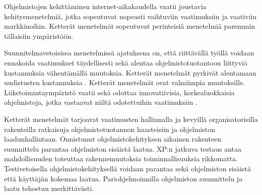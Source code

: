\documentclass[finnish]{tktltiki2}
\theoremstyle{definition}
\theoremstyle{remark}
\begin{document}
Ohjelmistojen kehittäminen internet-aikakaudella vaatii joustavia kehitysmenetelmiä, jotka sopeutuvat nopeasti vaihtuviin vaatimuksiin ja vaativiin markkinoihin. Ketterät menetelmät sopeutuvat perinteisiä menetelmiä paremmin tällaisiin ympäristöön.

Suunnitelmavetoisissa menetelmissä ajatuksena on, että riittävällä työllä voidaan ennakoida vaatimukset täydellisesti sekä alentaa ohjelmistotuotantoon liittyviä kustannuksia vähentämällä muutoksia. Ketterät menetelmät pyrkivät alentamaan uudistusten kustannuksia \cite{WIC03}. Ketterät menetelmät ovat valmiimpia muutoksille. Liiketoimintaympäristö vaatii sekä odottaa innovatiivisia, korkealuokkaisia ohjelmistoja, jotka vastaavat niiltä odotettuihin vaatimuksiin \cite{BRL03}.

Ketterät menetelmät tarjoavat vaatimusten hallinnalla ja kevyillä organisatorisilla rakenteilla ratkaisuja ohjelmistotuotannon haasteisiin ja ohjelmiston laadunhallintaan. Onnistunut ohjelmistokehityksen aikainen rakenteen suunnittelu parantaa ohjelmiston sisäistä laatua. XP:n jatkuva testaus antaa mahdollisuuden toteuttaa rakennemuutoksia toiminnallisuuksia rikkomatta. Testivetoisella ohjelmistokehityksellä voidaan parantaa sekä ohjelmiston sisäistä että käyttäjän kokemaa laatua. Pariohjelmoinnilla ohjelmiston suunnittelu ja laatu tehostuu merkittävästi.



%
%
% 
%



\end{document}
